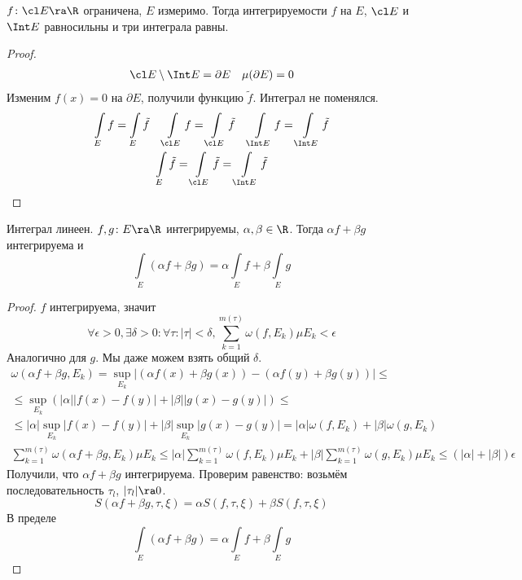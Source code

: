\item
	$f\colon \cl E \ra \R$ ограничена, $E$ измеримо.
	Тогда интегрируемости $f$ на $E$, $\cl E$ и $\Int E$ равносильны и три интеграла равны.
	\begin{proof}
		\begin{gather*}
			\cl E \setminus \Int E = \partial E \quad \mu (\partial E) = 0
		\end{gather*}
		Изменим $f(x) = 0$ на $\partial E$, получили функцию $\tilde f$.
		Интеграл не поменялся.
		\begin{gather*}
			\int\limits_E f = \int\limits_E \tilde f \quad
				\int\limits_{\cl E} f = \int\limits_{\cl E} \tilde f \quad
				\int\limits_{\Int E} f = \int\limits_{\Int E} \tilde f \\
			\int\limits_E \tilde f = \int\limits_{\cl E} \tilde f = \int\limits_{\Int E} \tilde f
		\end{gather*}
	\end{proof}

\item
	Интеграл линеен.
	$f, g\colon E \ra \R$ интегрируемы, $\alpha, \beta \in \R$.
	Тогда $\alpha f + \beta g$ интегрируема и
	\[ \int\limits_E (\alpha f + \beta g) = \alpha \int\limits_E f + \beta \int\limits_E g \]
	\begin{proof}
		$f$ интегрируема, значит
		\[
			\forall \epsilon>0, \exists \delta > 0\colon \forall \tau\colon |\tau| < \delta,
			\sum_{k=1}^{m(\tau)} \omega(f, E_k) \mu E_k < \epsilon
		\]
		Аналогично для $g$. Мы даже можем взять общий $\delta$.
		\begin{gather*}
			\omega(\alpha f + \beta g, E_k) = \sup_{E_k} \left| (\alpha f(x) + \beta g(x)) - (\alpha f(y) + \beta g(y))\right| \le \\
			\le \sup_{E_k} (|\alpha| |f(x) - f(y)| + |\beta| |g(x) - g(y)|) \le \\
			\le |\alpha| \sup_{E_k} |f(x) - f(y)| + |\beta| \sup_{E_k} |g(x) - g(y)| = |\alpha| \omega(f, E_k) + |\beta| \omega(g, E_k) \\
			\sum_{k=1}^{m(\tau)} \omega(\alpha f + \beta g, E_k) \mu E_k \le
				|\alpha| \sum_{k=1}^{m(\tau)} \omega(f, E_k) \mu E_k + |\beta| \sum_{k=1}^{m(\tau)} \omega(g, E_k) \mu E_k \le
				(|\alpha| + |\beta|) \epsilon
		\end{gather*}
		Получили, что $\alpha f + \beta g$ интегрируема.
		Проверим равенство: возьмём последовательность $\tau_l$, $|\tau_l| \ra 0$.
		\[ S(\alpha f + \beta g, \tau, \xi) = \alpha S(f, \tau, \xi) + \beta S(f, \tau, \xi) \]
		В пределе
		\[ \int\limits_E (\alpha f + \beta g) = \alpha \int\limits_E f + \beta \int\limits_E g \]
	\end{proof}

